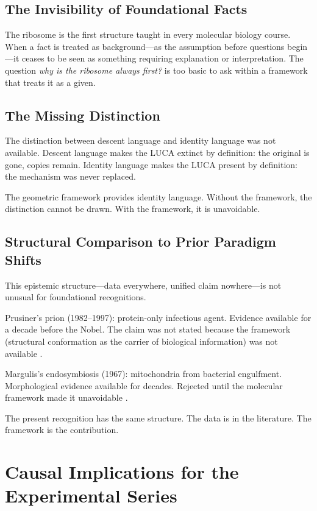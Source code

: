 \documentclass[11pt]{article}
\theoremstyle{definition}
\begin{document}
\subsection{The Invisibility of Foundational Facts}

The ribosome is the first structure taught in every molecular
biology course.
When a fact is treated as background---as the assumption before
questions begin---it ceases to be seen as something requiring
explanation or interpretation.
The question \emph{why is the ribosome always first?} is too
basic to ask within a framework that treats it as a given.

\subsection{The Missing Distinction}

The distinction between descent language and identity language
was not available.
Descent language makes the LUCA extinct by definition:
the original is gone, copies remain.
Identity language makes the LUCA present by definition:
the mechanism was never replaced.

The geometric framework provides identity language.
Without the framework, the distinction cannot be drawn.
With the framework, it is unavoidable.

\subsection{Structural Comparison to Prior Paradigm Shifts}

This epistemic structure---data everywhere, unified claim
nowhere---is not unusual for foundational recognitions.

Prusiner's prion (1982--1997): protein-only infectious agent.
Evidence available for a decade before the Nobel.
The claim was not stated because the framework (structural
conformation as the carrier of biological information) was
not available \cite{Prusiner1997}.

Margulis's endosymbiosis (1967): mitochondria from bacterial
engulfment.
Morphological evidence available for decades.
Rejected until the molecular framework made it unavoidable
\cite{Margulis1967}.

The present recognition has the same structure.
The data is in the literature.
The framework is the contribution.

\section{Causal Implications for the Experimental Series}
\end{document}
